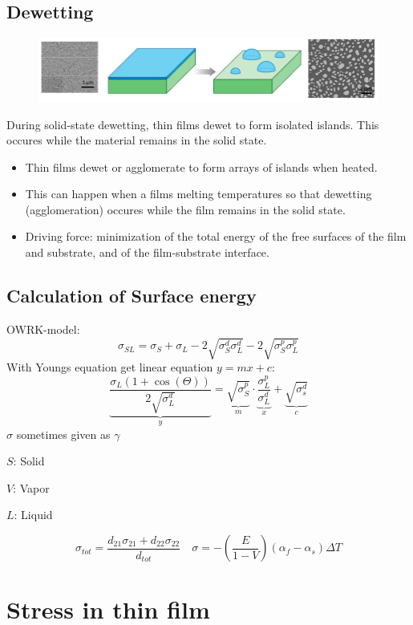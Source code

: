 \subsection{Dewetting}
\begin{figure}[h]
    \centering
    \includegraphics[width=\columnwidth]{images/dewetting.png}
    \label{fig:dewetting}
\end{figure}
During solid-state dewetting, thin films dewet to form isolated islands. This occures while the material remains in the solid state.
\begin{itemize}
    \item Thin films dewet or agglomerate to form arrays of islands when heated.
    \item This can happen when a films melting temperatures so that dewetting (agglomeration) occures while the film remains in the solid state.
    \item Driving force: minimization of the total energy of the free surfaces of the film and substrate, and of the film-substrate interface.
\end{itemize}

\subsection{Calculation of Surface energy}
OWRK-model:
\[
\sigma_{SL} = \sigma_{S} + \sigma_{L} - 2\sqrt{\sigma_S^d\sigma_L^d} - 2\sqrt{\sigma_S^p\sigma_L^p}
\]
With Youngs equation get linear equation \(y = mx + c\):
\[
\underbrace{\frac{\sigma_L (1+\cos(\Theta))}{2\sqrt{\sigma_L^d}}}_{y} 
= 
\underbrace{\sqrt{\sigma_S^p}}_{m}
\cdot
\underbrace{\frac{\sigma_L^p}{\sigma_L^d}}_{x} 
+ 
\underbrace{\sqrt{\sigma_s^d}}_{c}
\]
\(\sigma\) sometimes given as \(\gamma\)

\(S\): Solid

\(V\): Vapor

\(L\): Liquid

\[
\sigma_{tot} = \frac{d_{21}\sigma_{21} + d_{22}\sigma_{22}}{d_{tot}} \quad \sigma = -\left(\frac{E}{1-V}\right)\left(\alpha_f- \alpha_s\right)\Delta T
\]
\section{Stress in thin film}
\

